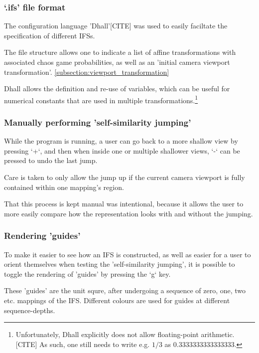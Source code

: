 \documentclass[11pt]{article}
\begin{document}
\subsubsection{`.ifs' file format}
\label{sec:orgb8ffe93}

The configuration language 'Dhall'[CITE] was used to 
easily faciltate the specification of different IFSs.

The file structure allows one to indicate a list of affine transformations with associated chaos game probabilities,
as well as an 'initial camera viewport transformation'. \autoref{subsection:viewport_transformation}

Dhall allows the definition and re-use of variables, which can be useful
for numerical constants that are used in multiple transformations.\footnote{Unfortunately, Dhall explicitly does not allow floating-point arithmetic.[CITE]
As such, one still needs to write e.g. \(1/3\) as \(0.3333333333333333\).}


\subsubsection{Manually performing 'self-similarity jumping'}
\label{sec:org67e7edc}

While the program is running, a user can go back to a more shallow view by pressing `+`, and then when inside one or multiple shallower views,
`-` can be pressed to undo the last jump.

Care is taken to only allow the jump up if the current camera viewport is fully contained within one mapping's region.

That this process is kept manual was intentional, because it allows the user to more easily compare how
the representation looks with and without the jumping.

\subsubsection{Rendering 'guides'}
\label{sec:org3252c46}

To make it easier to see how an IFS is constructed, as well as easier for a user to orient themselves when
testing the 'self-similarity jumping', it is possible to toggle the rendering of 'guides' by pressing the `g` key.

These 'guides' are the unit squre, after undergoing a sequence of zero, one, two etc. mappings of the IFS.
Different colours are used for guides at different sequence-depths.
\end{document}
